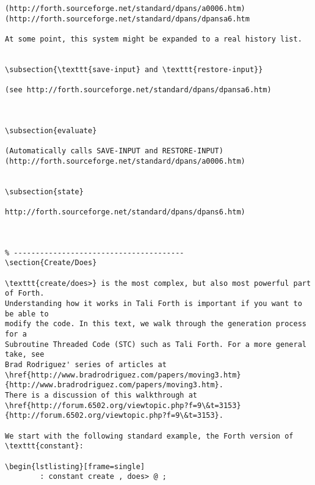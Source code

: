 \begin{lstlisting}[frame=single]
(http://forth.sourceforge.net/standard/dpans/a0006.htm)
(http://forth.sourceforge.net/standard/dpans/dpansa6.htm

At some point, this system might be expanded to a real history list.


\subsection{\texttt{save-input} and \texttt{restore-input}}

(see http://forth.sourceforge.net/standard/dpans/dpansa6.htm)



\subsection{evaluate}

(Automatically calls SAVE-INPUT and RESTORE-INPUT)
(http://forth.sourceforge.net/standard/dpans/a0006.htm)


\subsection{state}

http://forth.sourceforge.net/standard/dpans/dpans6.htm)



% ---------------------------------------
\section{Create/Does}

\texttt{create/does>} is the most complex, but also most powerful part of Forth.
Understanding how it works in Tali Forth is important if you want to be able to
modify the code. In this text, we walk through the generation process for a
Subroutine Threaded Code (STC) such as Tali Forth. For a more general take, see
Brad Rodriguez' series of articles at
\href{http://www.bradrodriguez.com/papers/moving3.htm}{http://www.bradrodriguez.com/papers/moving3.htm}.
There is a discussion of this walkthrough at
\href{http://forum.6502.org/viewtopic.php?f=9\&t=3153}{http://forum.6502.org/viewtopic.php?f=9\&t=3153}. 

We start with the following standard example, the Forth version of
\texttt{constant}: 

\begin{lstlisting}[frame=single]
        : constant create , does> @ ; 
\end{lstlisting}

